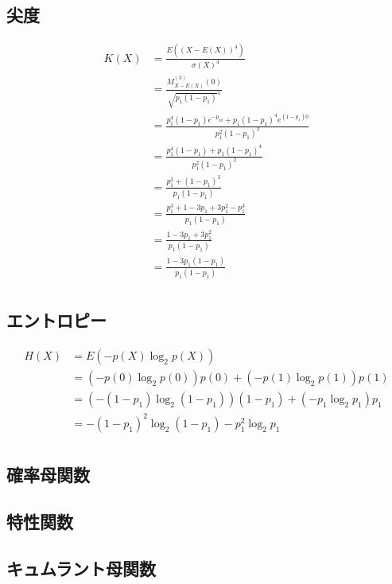 \documentclass[dvipdfmx]{jsarticle}
\begin{document}
 \subsection{尖度}
 \begin{align}
  K\left(X\right)&=\frac{E\left(\left(X-E\left(X\right)\right)^4\right)}{\sigma\left(X\right)^4}\nonumber\\
  &=\frac{M_{X-E\left(X\right)}^{\left(3\right)}\left(0\right)}{\sqrt{p_1\left(1-p_1\right)}^4}\nonumber\\
  &=\frac{p_1^4\left(1-p_1\right)e^{-p_10}+p_1\left(1-p_1\right)^4e^{\left(1-p_1\right)0}}{p_1^2\left(1-p_1\right)^2}\nonumber\\
  &=\frac{p_1^4\left(1-p_1\right)+p_1\left(1-p_1\right)^4}{p_1^2\left(1-p_1\right)^2}\nonumber\\
  &=\frac{p_1^3+\left(1-p_1\right)^3}{p_1\left(1-p_1\right)}\nonumber\\
  &=\frac{p_1^3+1-3p_1+3p_1^2-p_1^3}{p_1\left(1-p_1\right)}\nonumber\\
  &=\frac{1-3p_1+3p_1^2}{p_1\left(1-p_1\right)}\nonumber\\
  &=\frac{1-3p_1\left(1-p_1\right)}{p_1\left(1-p_1\right)}\nonumber\\
 \end{align}
 \subsection{エントロピー}
 \begin{align}
  H\left(X\right)&=E\left(-p\left(X\right)\log_2p\left(X\right)\right)\nonumber\\
  &=\left(-p\left(0\right)\log_2p\left(0\right)\right)p\left(0\right)+\left(-p\left(1\right)\log_2p\left(1\right)\right)p\left(1\right)\nonumber\\
  &=\left(-\left(1-p_1\right)\log_2\left(1-p_1\right)\right)\left(1-p_1\right)+\left(-p_1\log_2p_1\right)p_1\nonumber\\
  &=-\left(1-p_1\right)^2\log_2\left(1-p_1\right)-p_1^2\log_2p_1\nonumber\\
 \end{align}
 \subsection{確率母関数}
 \subsection{特性関数}
 \subsection{キュムラント母関数}
\end{document}
